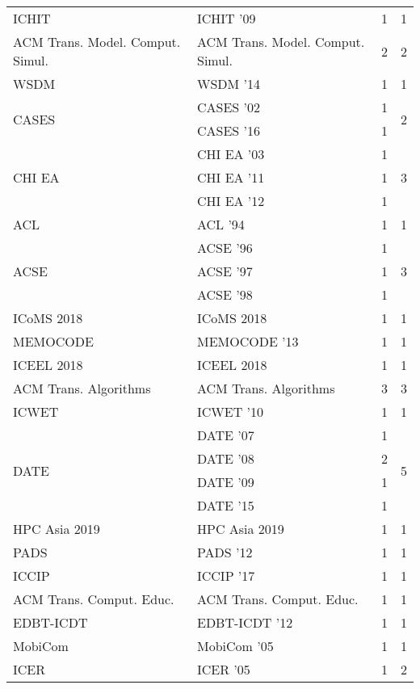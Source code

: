 \begin{table*}[t]
\begin{tabular}{llrr}
\multirow{1}{*}{ICHIT } & ICHIT '09 & 1 & \multirow{1}{*}{1}\\
\multirow{1}{*}{ACM Trans. Model. Comput. Simul.} & ACM Trans. Model. Comput. Simul. & 2 & \multirow{1}{*}{2}\\
\multirow{1}{*}{WSDM } & WSDM '14 & 1 & \multirow{1}{*}{1}\\
\multirow{2}{*}{CASES } & CASES '02 & 1 & \multirow{2}{*}{2}\\
& CASES '16 & 1 &\\
\multirow{3}{*}{CHI EA } & CHI EA '03 & 1 & \multirow{3}{*}{3}\\
& CHI EA '11 & 1 &\\
& CHI EA '12 & 1 &\\
\multirow{1}{*}{ACL } & ACL '94 & 1 & \multirow{1}{*}{1}\\
\multirow{3}{*}{ACSE } & ACSE '96 & 1 & \multirow{3}{*}{3}\\
& ACSE '97 & 1 &\\
& ACSE '98 & 1 &\\
\multirow{1}{*}{ICoMS 2018} & ICoMS 2018 & 1 & \multirow{1}{*}{1}\\
\multirow{1}{*}{MEMOCODE } & MEMOCODE '13 & 1 & \multirow{1}{*}{1}\\
\multirow{1}{*}{ICEEL 2018} & ICEEL 2018 & 1 & \multirow{1}{*}{1}\\
\multirow{1}{*}{ACM Trans. Algorithms} & ACM Trans. Algorithms & 3 & \multirow{1}{*}{3}\\
\multirow{1}{*}{ICWET } & ICWET '10 & 1 & \multirow{1}{*}{1}\\
\multirow{4}{*}{DATE } & DATE '07 & 1 & \multirow{4}{*}{5}\\
& DATE '08 & 2 &\\
& DATE '09 & 1 &\\
& DATE '15 & 1 &\\
\multirow{1}{*}{HPC Asia 2019} & HPC Asia 2019 & 1 & \multirow{1}{*}{1}\\
\multirow{1}{*}{PADS } & PADS '12 & 1 & \multirow{1}{*}{1}\\
\multirow{1}{*}{ICCIP } & ICCIP '17 & 1 & \multirow{1}{*}{1}\\
\multirow{1}{*}{ACM Trans. Comput. Educ.} & ACM Trans. Comput. Educ. & 1 & \multirow{1}{*}{1}\\
\multirow{1}{*}{EDBT-ICDT } & EDBT-ICDT '12 & 1 & \multirow{1}{*}{1}\\
\multirow{1}{*}{MobiCom } & MobiCom '05 & 1 & \multirow{1}{*}{1}\\
\multirow{2}{*}{ICER } & ICER '05 & 1 & \multirow{2}{*}{2}\\

\end{tabular}
\end{table*}
